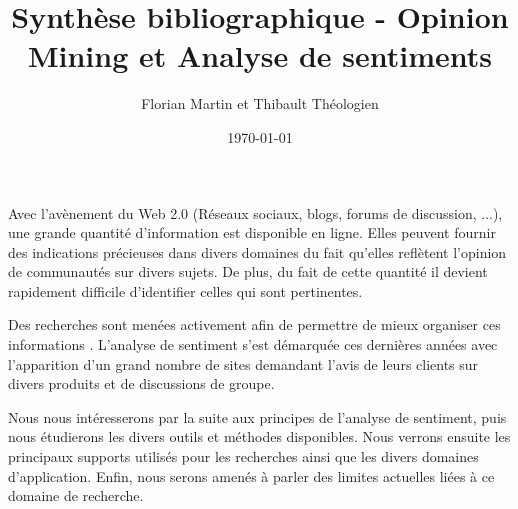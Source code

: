 \documentclass[8pt]{article}
\title{Synthèse bibliographique - Opinion Mining et Analyse de sentiments}
\author{Florian Martin et Thibault Théologien}
\date{\today}
\begin{document}
  \maketitle
  \begin{multicols}{2}

\par Avec l’avènement du Web 2.0 (Réseaux sociaux, blogs, forums de discussion, ...), une grande quantité d’information est disponible en ligne. Elles peuvent fournir des indications précieuses dans divers domaines du fait qu’elles reflètent l’opinion de communautés sur divers sujets. De plus, du fait de cette quantité il devient rapidement difficile d’identifier celles qui sont pertinentes.
\par Des recherches sont menées activement afin de permettre de mieux organiser ces informations \cite{ressource21} \cite{ressource2} \cite{ressource5}. L’analyse de sentiment s’est démarquée ces dernières années avec l’apparition d’un grand nombre de sites demandant l’avis de leurs clients sur divers produits et de discussions de groupe.
\par Nous nous intéresserons par la suite aux principes de l’analyse de sentiment, puis nous étudierons les divers outils et méthodes disponibles. Nous verrons ensuite les principaux supports utilisés pour les recherches ainsi que les divers domaines d’application. Enfin, nous serons amenés à parler des limites actuelles liées à ce domaine de recherche.


\end{multicols}
\end{document}
